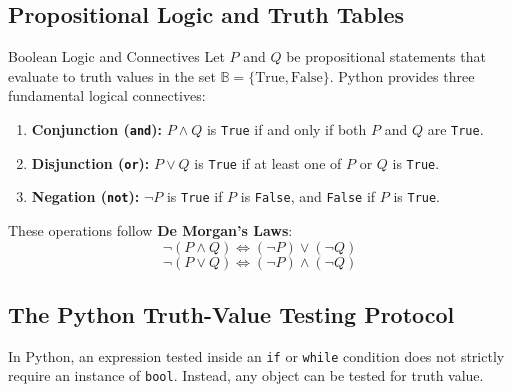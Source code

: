\subsection{Propositional Logic and Truth Tables}

\begin{definitionbox}{Boolean Logic and Connectives}
 
Let $P$ and $Q$ be propositional statements that evaluate to truth values in the set $\mathbb{B} = \{\text{True}, \text{False}\}$. Python provides three fundamental logical connectives:
\begin{enumerate}
    \item \textbf{Conjunction (\texttt{and}):} $P \land Q$ is \texttt{True} if and only if both $P$ and $Q$ are \texttt{True}.
    \item \textbf{Disjunction (\texttt{or}):} $P \lor Q$ is \texttt{True} if at least one of $P$ or $Q$ is \texttt{True}.
    \item \textbf{Negation (\texttt{not}):} $\neg P$ is \texttt{True} if $P$ is \texttt{False}, and \texttt{False} if $P$ is \texttt{True}.
\end{enumerate}
These operations follow \textbf{De Morgan's Laws}:
\begin{equation}
\neg(P \land Q) \iff (\neg P) \lor (\neg Q)
\end{equation}
\begin{equation}
\neg(P \lor Q) \iff (\neg P) \land (\neg Q)
\end{equation}
\end{definitionbox}

\subsection{The Python Truth-Value Testing Protocol}

In Python, an expression tested inside an \texttt{if} or \texttt{while} condition does not strictly require an instance of \texttt{bool}. Instead, any object can be tested for truth value.

